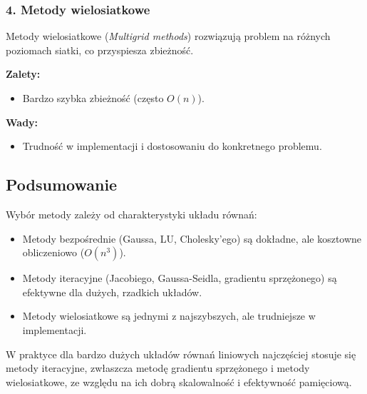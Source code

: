 \subsubsection{4. Metody wielosiatkowe}
Metody wielosiatkowe (\textit{Multigrid methods}) rozwiązują problem na różnych poziomach siatki, co przyspiesza zbieżność.

\textbf{Zalety:}
\begin{itemize}
    \item Bardzo szybka zbieżność (często \( O(n) \)).
\end{itemize}

\textbf{Wady:}
\begin{itemize}
    \item Trudność w implementacji i dostosowaniu do konkretnego problemu.
\end{itemize}

\subsection{Podsumowanie}
Wybór metody zależy od charakterystyki układu równań:
\begin{itemize}
    \item Metody bezpośrednie (Gaussa, LU, Cholesky’ego) są dokładne, ale kosztowne obliczeniowo (\( O(n^3) \)).
    \item Metody iteracyjne (Jacobiego, Gaussa-Seidla, gradientu sprzężonego) są efektywne dla dużych, rzadkich układów.
    \item Metody wielosiatkowe są jednymi z najszybszych, ale trudniejsze w implementacji.
\end{itemize}

W praktyce dla bardzo dużych układów równań liniowych najczęściej stosuje się metody iteracyjne, zwłaszcza metodę gradientu sprzężonego i metody wielosiatkowe, ze względu na ich dobrą skalowalność i efektywność pamięciową.
